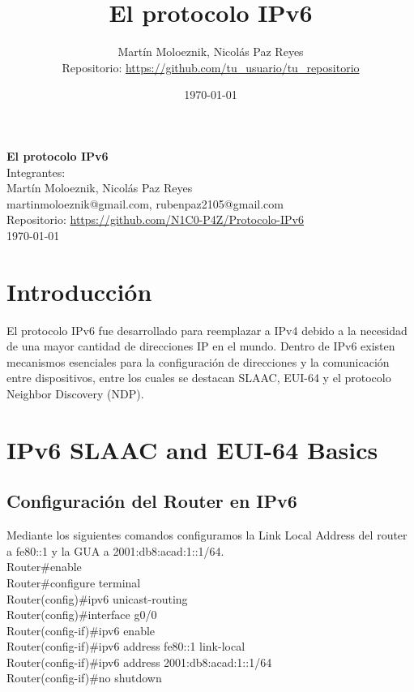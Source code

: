 \documentclass[a4paper,12pt]{article}
\title{El protocolo IPv6}
\author{Martín Moloeznik, Nicolás Paz Reyes\\[0.5em]
Repositorio: \url{https://github.com/tu_usuario/tu_repositorio}}
\date{\today}
\begin{document}
\begin{titlepage}
  \centering
  \vspace*{2cm}
  {\large \textbf{El protocolo IPv6}}\\[1.5cm]
  
  {\large Integrantes:}\\
   \bigskip
  {\large Martín Moloeznik, Nicolás Paz Reyes} \\[0.5cm]
  {\large {martinmoloeznik@gmail.com}, {rubenpaz2105@gmail.com}} \\[0.5cm]
  \bigskip
  {\large Repositorio: \url{https://github.com/N1C0-P4Z/Protocolo-IPv6}}\\[1cm]
  
  \vfill
  {\large \today}
\end{titlepage}

\tableofcontents
\newpage

\section*{Introducción}
\setcounter{section}{0}
El protocolo IPv6 fue desarrollado para reemplazar a IPv4 debido a la necesidad de una mayor cantidad de direcciones IP en el mundo. Dentro de IPv6 existen mecanismos esenciales para la configuración de direcciones y la comunicación entre dispositivos, entre los cuales se destacan SLAAC, EUI-64 y el protocolo Neighbor Discovery (NDP).

\section{IPv6 SLAAC and EUI-64 Basics}
\subsection{Configuración del Router en IPv6}



Mediante los siguientes comandos configuramos la Link Local Address del router a fe80::1 y la GUA a 2001:db8:acad:1::1/64.\\

\noindent Router\#enable\\
Router\#configure terminal\\
Router(config)\#ipv6 unicast-routing\\
Router(config)\#interface g0/0\\
Router(config-if)\#ipv6 enable\\
Router(config-if)\#ipv6 address fe80::1 link-local\\
Router(config-if)\#ipv6 address 2001:db8:acad:1::1/64\\
Router(config-if)\#no shutdown\\
\end{document}
